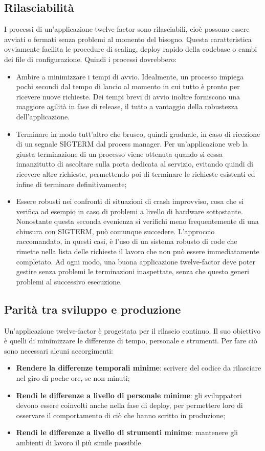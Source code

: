 \documentclass[PianoDiQualifica.tex]{subfiles}
\begin{document}
\subsection{Rilasciabilità}
I processi di un'applicazione twelve-factor sono rilasciabili, cioè possono essere avviati o fermati senza problemi al momento del bisogno. Questa caratteristica ovviamente facilita le procedure di scaling, deploy rapido della codebase o cambi dei file di configurazione.
Quindi i processi dovrebbero:
\begin{itemize}
\item Ambire a minimizzare i tempi di avvio. Idealmente, un processo impiega pochi secondi dal tempo di lancio al momento in cui tutto è pronto per ricevere nuove richieste. Dei tempi brevi di avvio inoltre forniscono una maggiore agilità in fase di release, il tutto a vantaggio della robustezza dell'applicazione.
\item Terminare in modo tutt'altro che brusco, quindi graduale, in caso di ricezione di un segnale SIGTERM dal process manager. Per un'applicazione web la giusta terminazione di un processo viene ottenuta quando si cessa innanzitutto di ascoltare sulla porta dedicata al servizio, evitando quindi di ricevere altre richieste, permettendo poi di terminare le richieste esistenti ed infine di terminare definitivamente;
\item Essere robusti nei confronti di situazioni di crash improvviso, cosa che si verifica ad esempio in caso di problemi a livello di hardware sottostante. Nonostante questa seconda evenienza si verifichi meno frequentemente di una chiusura con SIGTERM, può comunque succedere. L'approccio raccomandato, in questi casi, è l'uso di un sistema robusto di code che rimette nella lista delle richieste il lavoro che non può essere immediatamente completato. Ad ogni modo, una buona applicazione twelve-factor deve poter gestire senza problemi le terminazioni inaspettate, senza che questo generi problemi al successivo esecuzione.
\end{itemize}

\subsection{Parità tra sviluppo e produzione}
Un'applicazione twelve-factor è progettata per il rilascio continuo. Il suo obiettivo è quelli di minimizzare le differenze di tempo, personale e strumenti.
Per fare ciò sono necessari alcuni accorgimenti:
\begin{itemize}
\item \textbf{Rendere la differenze temporali minime}: scrivere del codice da rilasciare nel giro di poche ore, se non minuti;
\item \textbf{Rendi le differenze a livello di personale minime}: gli sviluppatori devono essere coinvolti anche nella fase di deploy, per permettere loro di osservare il comportamento di ciò che hanno scritto in produzione;
\item \textbf{Rendi le differenze a livello di strumenti minime}: mantenere gli ambienti di lavoro il più simile possibile.
\end{itemize}
\end{document}
